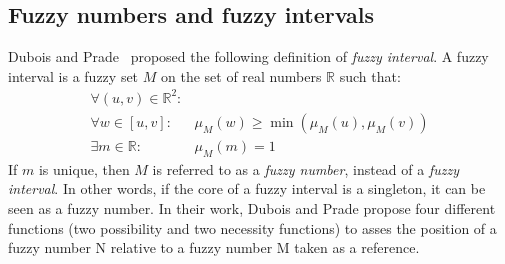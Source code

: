 





\subsection*{\label{subsec:fuzzy-numbers}Fuzzy numbers and fuzzy intervals}
Dubois and Prade~\cite{Dubois1983} proposed the following definition of \emph{fuzzy interval}.
A fuzzy interval is a fuzzy set $M$ on the set of real numbers $\mathbb{R}$ such that:
\begin{eqnarray}
\forall (u,v)\in\mathbb{R}^2:&\\
\nonumber
\forall w \in [u,v]:&\mu_M(w) \geq\min(\mu_M(u),\mu_M(v))  \\
\exists m \in \mathbb{R}:& \mu_M(m)=1 
\end{eqnarray}
If $m$ is unique, then $M$ is referred to as a \emph{fuzzy number}, instead of a \emph{fuzzy interval}. In other words, if the core of a fuzzy interval is a singleton, it can be seen as a fuzzy number. In their work, Dubois and Prade propose four different functions (two possibility and two necessity functions) to asses the position of a fuzzy number N relative to  a fuzzy number M taken as a reference.

